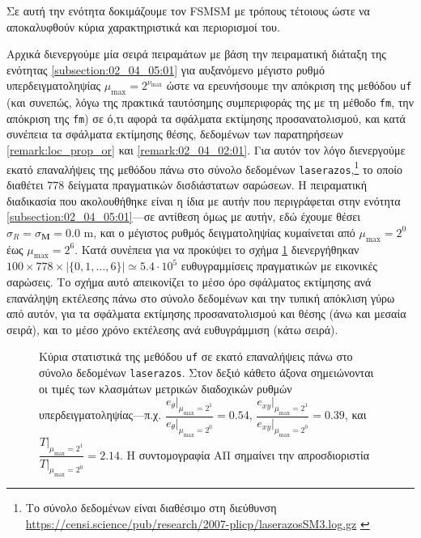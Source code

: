 Σε αυτή την ενότητα δοκιμάζουμε τον FSMSM με τρόπους τέτοιους ώστε να
αποκαλυφθούν κύρια χαρακτηριστικά και περιορισμοί του.

Αρχικά διενεργούμε μία σειρά πειραμάτων με βάση την πειραματική διάταξη της
ενότητας \ref{subsection:02_04_05:01} για αυξανόμενο μέγιστο ρυθμό
υπερδειγματοληψίας $\mu_{\max} = 2^{\nu_{\max}}$ ώστε να ερευνήσουμε την
απόκριση της μεθόδου \texttt{uf} (και συνεπώς, λόγω της πρακτικά ταυτόσημης
συμπεριφοράς της με τη μέθοδο \texttt{fm}, την απόκριση της \texttt{fm}) σε
ό,τι αφορά τα σφάλματα εκτίμησης προσανατολισμού, και κατά συνέπεια τα σφάλματα
εκτίμησης θέσης, δεδομένων των παρατηρήσεων \ref{remark:loc_prop_or} και
\ref{remark:02_04_02:01}. Για αυτόν τον λόγο διενεργούμε εκατό επαναλήψεις της
μεθόδου πάνω στο σύνολο δεδομένων \texttt{laserazos},\footnote{Το σύνολο
δεδομένων είναι διαθέσιμο στη διεύθυνση
\url{https://censi.science/pub/research/2007-plicp/laserazosSM3.log.gz}
\label{foot:laserazos}} το οποίο διαθέτει $778$ δείγματα πραγματικών
δισδιάστατων σαρώσεων. Η πειραματική διαδικασία που ακολουθήθηκε είναι η ίδια
με αυτήν που περιγράφεται στην ενότητα \ref{subsection:02_04_05:01}---σε
αντίθεση όμως με αυτήν, εδώ έχουμε θέσει $\sigma_R = \sigma_{\bm{M}} = 0.0$ m,
και ο μέγιστος ρυθμός δειγματοληψίας κυμαίνεται από $\mu_{\max} = 2^0$ έως
$\mu_{\max} = 2^6$. Κατά συνέπεια για να προκύψει το σχήμα
\ref{fig:02_04_06:01} διενεργήθηκαν $100 \times 778 \times |\{0,1,\dots,6\}|
\simeq 5.4\cdot 10^5$ ευθυγραμμίσεις πραγματικών με εικονικές σαρώσεις. Το
σχήμα αυτό απεικονίζει το μέσο όρο σφάλματος εκτίμησης ανά επανάληψη εκτέλεσης
πάνω στο σύνολο δεδομένων και την τυπική απόκλιση γύρω από αυτόν, για τα
σφάλματα εκτίμησης προσανατολισμού και θέσης (άνω και μεσαία σειρά), και το
μέσο χρόνο εκτέλεσης ανά ευθυγράμμιση (κάτω σειρά).

\begin{figure}\centering
  
  \caption{\small Κύρια στατιστικά της μεθόδου \texttt{uf} σε εκατό επαναλήψεις
           πάνω στο σύνολο δεδομένων \texttt{laserazos}. Στον δεξιό κάθετο άξονα
           σημειώνονται οι τιμές των κλασμάτων μετρικών διαδοχικών ρυθμών
           υπερδειγματοληψίας---π.χ.
           $\dfrac{e_{\theta}|_{\mu_{\max} = 2^1}}{e_{\theta}|_{\mu_{\max} = 2^0}} = 0.54$,
           $\dfrac{e_{xy}|_{\mu_{\max} = 2^1}}{e_{xy}|_{\mu_{\max} = 2^0}} = 0.39$,
           και $\dfrac{T|_{\mu_{\max} = 2^1}}{T|_{\mu_{\max} = 2^0}} = 2.14$. Η
           συντομογραφία ΑΠ σημαίνει την απροσδιοριστία}
  \label{fig:02_04_06:01}
\end{figure}

